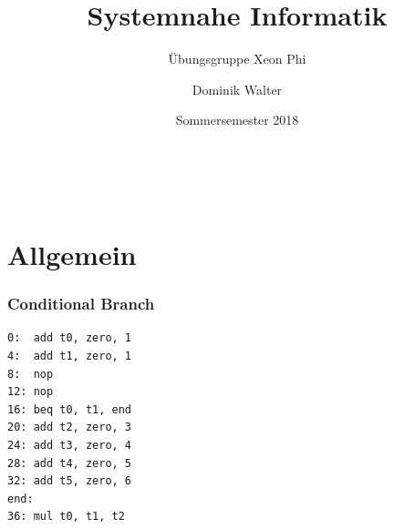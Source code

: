 \documentclass[xcolor=pdftex,dvipsnames,table]{beamer}
\title{Systemnahe Informatik}
\subtitle{Übungsgruppe Xeon Phi}
\author{Dominik Walter}
\date{Sommersemester 2018}
\begin{document}
	
	\begin{frame}
	\frametitle{\ }
	\titlepage
\end{frame}
%
%		
%
%
%


\section{Allgemein}



\begin{frame}[fragile]
\frametitle{Conditional Branch}
\centering
\begin{lstlisting}
0:	add t0, zero, 1
4:	add t1, zero, 1
8:	nop
12:	nop
16:	beq t0, t1, end
20:	add t2, zero, 3
24:	add t3, zero, 4
28:	add t4, zero, 5
32:	add t5, zero, 6
end:
36:	mul t0, t1, t2
\end{lstlisting}
\end{frame}
\end{document}
